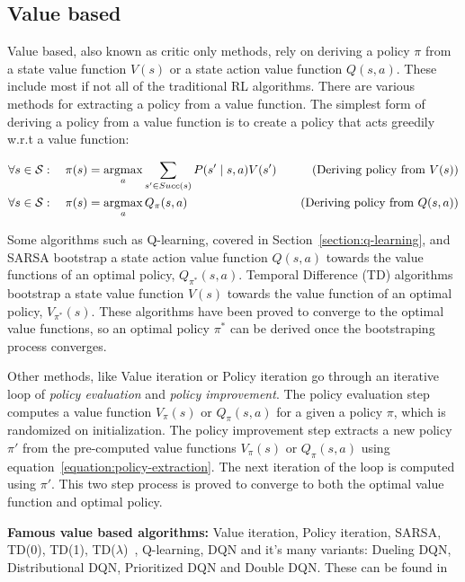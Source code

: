 \documentclass{../main.tex}{}
\begin{document}
\subsection{Value based}
Value based, also known as critic only methods, rely on deriving a policy $\pi$ from a state value function $V(s)$ or a state action value function $Q(s,a)$. These include most if not all of the traditional RL algorithms. There are various methods for extracting a policy from a value function. The simplest form of deriving a policy from a value function is to create a policy that acts greedily w.r.t a value function:

\begin{equation}
    \label{equation:policy-extraction}
\begin{aligned}
    \forall s \in \mathcal{S}: \quad \pi(s) &= \operatorname*{argmax}_{a} \sum_{s' \in Succ(s)} P(s' \mid s, a) V(s') \quad & (\text{Deriving policy from } V(s)) \\
    \forall s \in \mathcal{S}: \quad \pi(s) &= \operatorname*{argmax}_{a} Q_{\pi}(s,a) \quad & (\text{Deriving policy from } Q(s,a))
\end{aligned}
\end{equation}

Some algorithms such as Q-learning, covered in Section~\ref{section:q-learning}, and SARSA bootstrap a state action value function $Q(s,a)$ towards the value functions of an optimal policy, $Q_{\pi^*}(s,a)$. Temporal Difference (TD) algorithms bootstrap a state value function $V(s)$ towards the value function of an optimal policy, $V_{\pi^*}(s)$. These algorithms have been proved to converge to the optimal value functions, so an optimal policy $\pi^*$ can be derived once the bootstraping process converges.

Other methods, like Value iteration or Policy iteration go through an iterative loop of \textit{policy evaluation} and \textit{policy improvement}. The policy evaluation step computes a value function $V_{\pi}(s)$ or $Q_{\pi}(s,a)$ for a given a policy $\pi$, which is randomized on initialization. The policy improvement step extracts a new policy $\pi'$ from the pre-computed value functions $V_{\pi}(s)$ or $Q_{\pi}(s,a)$ using equation~\ref{equation:policy-extraction}. The next iteration of the loop is computed using $\pi'$. This two step process is proved to converge to both the optimal value function and optimal policy.

\textbf{Famous value based algorithms:} Value iteration, Policy iteration, SARSA, TD(0), TD(1), TD($\lambda$)~\citep{Sutton1998}, Q-learning, DQN and it's many variants: Dueling DQN, Distributional DQN, Prioritized DQN and Double DQN\@. These can be found in~\citep{Hessel2017}
\end{document}
